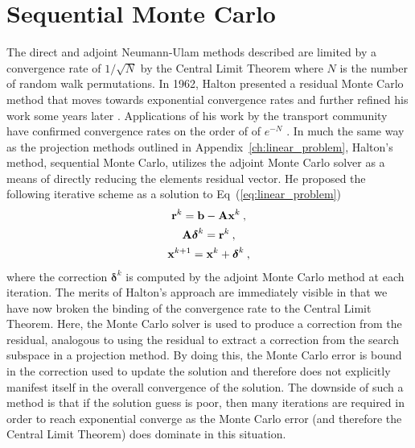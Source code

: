 \clearpage

\section{Sequential Monte Carlo}
\label{sec:sequential_mc}
The direct and adjoint Neumann-Ulam methods described are limited by a
convergence rate of $1/\sqrt{N}$ by the Central Limit Theorem where
$N$ is the number of random walk permutations. In 1962, Halton
presented a residual Monte Carlo method that moves towards exponential
convergence rates \cite{halton_sequential_1962} and further refined
his work some years later \cite{halton_sequential_1994}. Applications
of his work by the transport community have confirmed convergence
rates on the order of of $e^{-N}$ \cite{evans_residual_2003}. In much
the same way as the projection methods outlined in
Appendix~\ref{ch:linear_problem}, Halton's method, sequential Monte
Carlo, utilizes the adjoint Monte Carlo solver as a means of directly
reducing the elements residual vector. He proposed the following
iterative scheme as a solution to Eq~(\ref{eq:linear_problem})\:
\begin{subequations}
  \begin{gather}
    \mathbf{r}^k = \mathbf{b} - \mathbf{A}\mathbf{x}^k\:,\\  
    \mathbf{A}\boldsymbol{\delta}^{k} = \mathbf{r}^{k}\:,\\
    \mathbf{x}^{k+1} = \mathbf{x}^k + \boldsymbol{\delta}^{k}\:,
  \end{gather}
  \label{eq:sequential_monte_carlo}
\end{subequations}
where the correction $\boldsymbol{\delta}^k$ is computed by the
adjoint Monte Carlo method at each iteration. The merits of Halton's
approach are immediately visible in that we have now broken the
binding of the convergence rate to the Central Limit Theorem. Here,
the Monte Carlo solver is used to produce a correction from the
residual, analogous to using the residual to extract a correction from
the search subspace in a projection method. By doing this, the Monte
Carlo error is bound in the correction used to update the solution and
therefore does not explicitly manifest itself in the overall
convergence of the solution. The downside of such a method is that if
the solution guess is poor, then many iterations are required in order
to reach exponential converge as the Monte Carlo error (and therefore
the Central Limit Theorem) does dominate in this situation.

